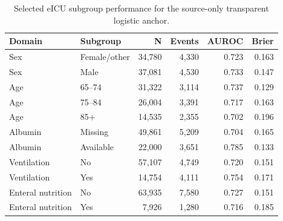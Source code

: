 \documentclass[utf8]{frontiers_suppmat}
\begin{document}
\begin{table}[!htbp]
\centering
\caption{Selected eICU subgroup performance for the source-only transparent logistic anchor.}
\label{tab:subgroup_s6}
\small
\begin{tabular}{llrrrr}
\toprule
Domain & Subgroup & N & Events & AUROC & Brier\\
\midrule
Sex & Female/other & 34,780 & 4,330 & 0.723 & 0.163\\
Sex & Male & 37,081 & 4,530 & 0.733 & 0.147\\
Age & 65--74 & 31,322 & 3,114 & 0.737 & 0.129\\
Age & 75--84 & 26,004 & 3,391 & 0.717 & 0.163\\
Age & 85+ & 14,535 & 2,355 & 0.702 & 0.196\\
Albumin & Missing & 49,861 & 5,209 & 0.704 & 0.165\\
Albumin & Available & 22,000 & 3,651 & 0.785 & 0.133\\
Ventilation & No & 57,107 & 4,749 & 0.720 & 0.151\\
Ventilation & Yes & 14,754 & 4,111 & 0.754 & 0.171\\
Enteral nutrition & No & 63,935 & 7,580 & 0.727 & 0.151\\
Enteral nutrition & Yes & 7,926 & 1,280 & 0.716 & 0.185\\
\bottomrule
\end{tabular}
\end{table}

\begin{table}[!htbp]
\centering
\caption{Initial SOTA tabular-model benchmark. Bold values indicate the best value in each displayed metric column; lower Brier score and ECE are better.}
\label{tab:sota_s7}
\noindent{}
\end{table}
\end{document}
